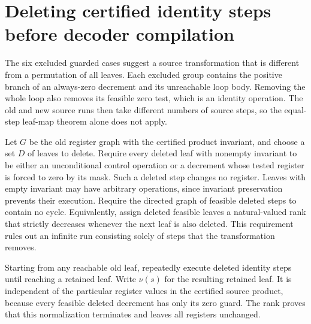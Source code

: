 \section{Deleting certified identity steps before decoder compilation}
\label{sec:identity-collapse}

The six excluded guarded cases suggest a source transformation that
is different from a permutation of all leaves.  Each excluded group
contains the positive branch of an always-zero decrement and its
unreachable loop body.  Removing the whole loop also removes its
feasible zero test, which is an identity operation.  The old and new
source runs then take different numbers of source steps, so the
equal-step leaf-map theorem alone does not apply.

Let $G$ be the old register graph with the certified product invariant,
and choose a set $D$ of leaves to delete.  Require every deleted leaf
with nonempty invariant to be either an unconditional control operation
or a decrement whose tested register is forced to zero by its mask.
Such a deleted step changes no register.  Leaves with empty invariant
may have arbitrary operations, since invariant preservation prevents
their execution.  Require the directed graph of feasible deleted steps
to contain no cycle.  Equivalently, assign deleted feasible leaves a
natural-valued rank that strictly decreases whenever the next leaf is
also deleted.  This requirement rules out an infinite run consisting
solely of steps that the transformation removes.

Starting from any reachable old leaf, repeatedly execute deleted
identity steps until reaching a retained leaf.  Write $\nu(s)$ for
the resulting retained leaf.  It is independent of the particular
register values in the certified source product, because every feasible
deleted decrement has only its zero guard.  The rank proves that this
normalization terminates and leaves all registers unchanged.

